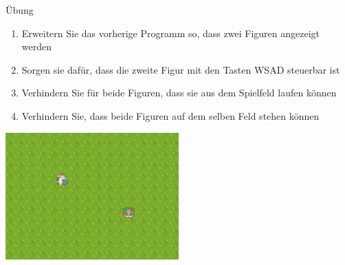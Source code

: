 \documentclass[presentation]{beamer}
\begin{document}
\begin{frame}[label={sec:orgad2b571}]{Übung}
\begin{enumerate}
\item Erweitern Sie das vorherige Programm so, dass zwei Figuren angezeigt werden
\item Sorgen sie dafür, dass die zweite Figur mit den Tasten WSAD steuerbar ist
\item Verhindern Sie für beide Figuren, dass sie aus dem Spielfeld laufen können
\item Verhindern Sie, dass beide Figuren auf dem selben Feld stehen können
\end{enumerate}
\begin{center}\begin{center}
\includegraphics[width=0.5\textwidth]{data/07/5f8661-1d63-4374-98be-36d9b786a222/screenshot-20200228-142923.png}
\end{center}\end{center}
\end{frame}
\end{document}
